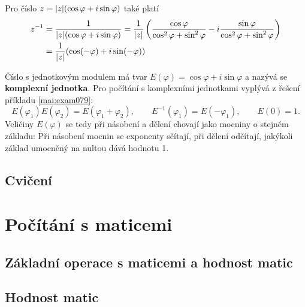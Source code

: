     Pro číslo \(z = \lvert z\rvert(\cos\varphi+ i\sin\varphi)\) také platí
    \begin{align*}
      z^{-1} &= \dfrac{1}{\lvert z\rvert(\cos\varphi+ i\sin\varphi)} 
              = \dfrac{1}{\lvert z\rvert}
                \left(\dfrac{\cos\varphi}{\cos^2\varphi + \sin^2\varphi}
                    -i\dfrac{\sin\varphi}{\cos^2\varphi + \sin^2\varphi}\right) \\
             &= \dfrac{1}{\lvert z\rvert}(\cos(-\varphi)+ i\sin(-\varphi))
    \end{align*}
    
    Číslo s jednotkovým modulem má tvar \(E(\varphi) = \cos\varphi+i\sin\varphi\) a nazývá se 
    \textbf{komplexní jednotka}. Pro počítání s komplexními jednotkami vyplývá z řešení příkladu 
    \ref{mai:exam079}:
    \begin{equation}\label{mai:eq75}
      E(\varphi_1)E(\varphi_2) = E(\varphi_1 + \varphi_2), \qquad  
      E^{-1}(\varphi_1) = E(-\varphi_1), \qquad E(0) = 1.
    \end{equation}
    Veličiny \(E(\varphi)\) se tedy při násobení a dělení chovají jako mocniny o stejném základu: 
    Při násobení mocnin se exponenty sčítají, při dělení odčítají, jakýkoli základ umocněný na 
    nultou dává hodnotu \num{1}. 
    \subsection{Cvičení}
  \section{Počítání s maticemi}\label{mai:IchapIIsecIII}
    \subsection{Základní operace s maticemi a hodnost matic}\label{mai:IchapIIsecIIIsubI}
    \subsection{Hodnost matic}\label{mai:IchapIIsecIIIsubII}

